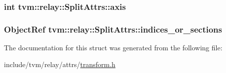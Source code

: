 \subsubsection[{\texorpdfstring{axis}{axis}}]{\setlength{\rightskip}{0pt plus 5cm}int tvm\+::relay\+::\+Split\+Attrs\+::axis}\hypertarget{structtvm_1_1relay_1_1SplitAttrs_aa7f0e8e2bab7a0726918fa9ea5d3258f}{}\label{structtvm_1_1relay_1_1SplitAttrs_aa7f0e8e2bab7a0726918fa9ea5d3258f}
\subsubsection[{\texorpdfstring{indices\+\_\+or\+\_\+sections}{indices_or_sections}}]{\setlength{\rightskip}{0pt plus 5cm}Object\+Ref tvm\+::relay\+::\+Split\+Attrs\+::indices\+\_\+or\+\_\+sections}\hypertarget{structtvm_1_1relay_1_1SplitAttrs_a285b0073659f6403fb5ef3808347f3c9}{}\label{structtvm_1_1relay_1_1SplitAttrs_a285b0073659f6403fb5ef3808347f3c9}


The documentation for this struct was generated from the following file\+:\begin{DoxyCompactItemize}
\item 
include/tvm/relay/attrs/\hyperlink{include_2tvm_2relay_2attrs_2transform_8h}{transform.\+h}\end{DoxyCompactItemize}
